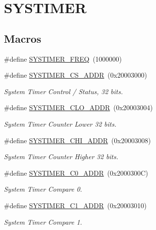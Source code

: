 \hypertarget{group__SYSTIMER}{}\section{S\+Y\+S\+T\+I\+M\+ER}
\label{group__SYSTIMER}
\subsection*{Macros}
\begin{DoxyCompactItemize}
\item 
\#define \hyperlink{group__SYSTIMER_gafeebbd2589412bdf2a7adc37273c8701}{S\+Y\+S\+T\+I\+M\+E\+R\+\_\+\+F\+R\+EQ}~(1000000)
\item 
\#define \hyperlink{group__SYSTIMER_ga70b5db2a1bac4db4cc0b1a7d32318931}{S\+Y\+S\+T\+I\+M\+E\+R\+\_\+\+C\+S\+\_\+\+A\+D\+DR}~(0x20003000)
\begin{DoxyCompactList}\small\item\em System Timer Control / Status, 32 bits. \end{DoxyCompactList}\item 
\#define \hyperlink{group__SYSTIMER_gab2062059c3d04229aa948a7bbbfbd18c}{S\+Y\+S\+T\+I\+M\+E\+R\+\_\+\+C\+L\+O\+\_\+\+A\+D\+DR}~(0x20003004)
\begin{DoxyCompactList}\small\item\em System Timer Counter Lower 32 bits. \end{DoxyCompactList}\item 
\#define \hyperlink{group__SYSTIMER_ga19c4451a4590b53adb2369ef8a92b026}{S\+Y\+S\+T\+I\+M\+E\+R\+\_\+\+C\+H\+I\+\_\+\+A\+D\+DR}~(0x20003008)
\begin{DoxyCompactList}\small\item\em System Timer Counter Higher 32 bits. \end{DoxyCompactList}\item 
\#define \hyperlink{group__SYSTIMER_ga47fa566f203db74cf2cef46da4cc2cf2}{S\+Y\+S\+T\+I\+M\+E\+R\+\_\+\+C0\+\_\+\+A\+D\+DR}~(0x2000300\+C)
\begin{DoxyCompactList}\small\item\em System Timer Compare 0. \end{DoxyCompactList}\item 
\#define \hyperlink{group__SYSTIMER_gacd54e6d83dd922375b7400f59d1581f6}{S\+Y\+S\+T\+I\+M\+E\+R\+\_\+\+C1\+\_\+\+A\+D\+DR}~(0x20003010)
\begin{DoxyCompactList}\small\item\em System Timer Compare 1. \end{DoxyCompactList}\item 

\end{DoxyCompactItemize}
